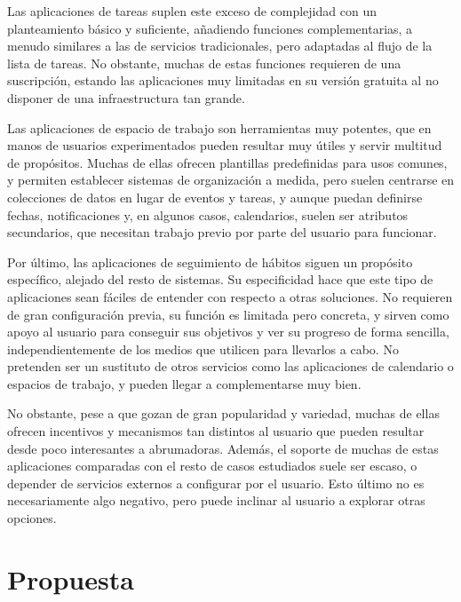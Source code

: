 \documentclass[10pt, a4paper]{aqademic}
\begin{document}
\medskip

Las aplicaciones de tareas suplen este exceso de complejidad con un planteamiento básico y suficiente, añadiendo funciones complementarias, a menudo similares a las de servicios tradicionales, pero adaptadas al flujo de la lista de tareas. No obstante, muchas de estas funciones requieren de una suscripción, estando las aplicaciones muy limitadas en su versión gratuita al no disponer de una infraestructura tan grande. 

\medskip

Las aplicaciones de espacio de trabajo son herramientas muy potentes, que en manos de usuarios experimentados pueden resultar muy útiles y servir multitud de propósitos. Muchas de ellas ofrecen plantillas predefinidas para usos comunes, y permiten establecer sistemas de organización a medida, pero suelen centrarse en colecciones de datos en lugar de eventos y tareas, y aunque puedan definirse fechas, notificaciones y, en algunos casos, calendarios, suelen ser atributos secundarios, que necesitan trabajo previo por parte del usuario para funcionar.

\medskip

Por último, las aplicaciones de seguimiento de hábitos siguen un propósito específico, alejado del resto de sistemas. Su especificidad hace que este tipo de aplicaciones sean fáciles de entender con respecto a otras soluciones. No requieren de gran configuración previa, su función es limitada pero concreta, y sirven como apoyo al usuario para conseguir sus objetivos y ver su progreso de forma sencilla, independientemente de los medios que utilicen para llevarlos a cabo. No pretenden ser un sustituto de otros servicios como las aplicaciones de calendario o espacios de trabajo, y pueden llegar a complementarse muy bien.

No obstante, pese a que gozan de gran popularidad y variedad, muchas de ellas ofrecen incentivos y mecanismos tan distintos al usuario que pueden resultar desde poco interesantes a abrumadoras. Además, el soporte de muchas de estas aplicaciones comparadas con el resto de casos estudiados suele ser escaso, o depender de servicios externos a configurar por el usuario. Esto último no es necesariamente algo negativo, pero puede inclinar al usuario a explorar otras opciones.


\section{Propuesta}
\end{document}
